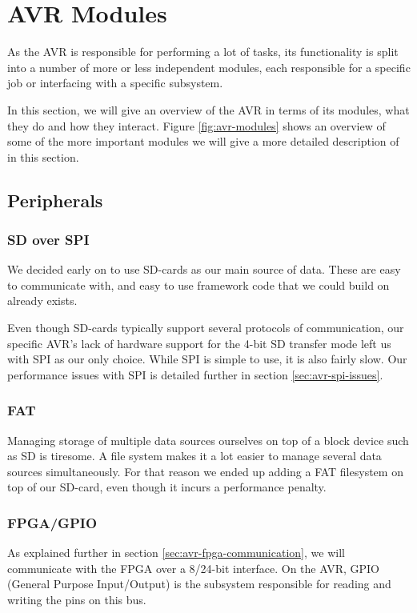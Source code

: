 \section{AVR Modules}
As the AVR is responsible for performing a lot of tasks, its
functionality is split into a number of more or less independent
modules, each responsible for a specific job or interfacing with a
specific subsystem.

In this section, we will give an overview of the AVR in terms of its
modules, what they do and how they interact. Figure
\ref{fig:avr-modules} shows an overview of some of the more important
modules we will give a more detailed description of in this section.



\subsection{Peripherals}
\subsubsection{SD over SPI}
We decided early on to use SD-cards as our main source of data. These
are easy to communicate with, and easy to use framework code that we
could build on already exists.

Even though SD-cards typically support several protocols of
communication, our specific AVR's lack of hardware support for the 4-bit
SD transfer mode left us with SPI as our only choice. While SPI is
simple to use, it is also fairly slow. Our performance issues with SPI
is detailed further in section \ref{sec:avr-spi-issues}.

\subsubsection{FAT}
Managing storage of multiple data sources ourselves on top of a block
device such as SD is tiresome. A file system makes it a lot easier
to manage several data sources simultaneously. For that reason we ended
up adding a FAT filesystem on top of our SD-card, even though it incurs
a performance penalty. 

\subsubsection{FPGA/GPIO}
As explained further in section \ref{sec:avr-fpga-communication}, we
will communicate with the FPGA over a 8/24-bit interface. On the AVR,
GPIO (General Purpose Input/Output) is the subsystem responsible for
reading and writing the pins on this bus.


